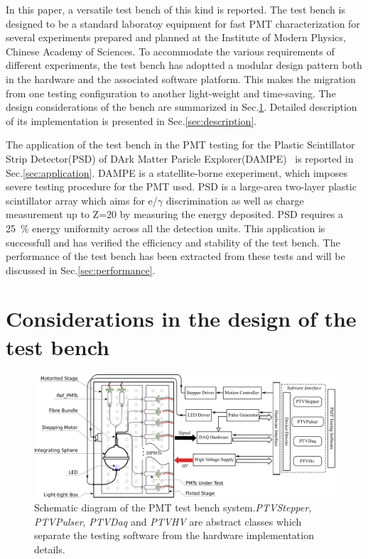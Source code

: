 \documentclass[5p, times]{elsarticle}
\begin{document}
In this paper, a versatile test bench of this kind is reported.
The test bench is designed to be a standard laboratoy equipment for fast PMT characterization for several experiments prepared and planned at the Institute of Modern Physics, Chinese Academy of Sciences.
To accommodate the various requirements of different experiments, the test bench has adoptted a modular design pattern both in the hardware and the associated software platform.
This makes the migration from one testing configuration to another light-weight and time-saving.
The design considerations of the bench are summarized in Sec.\ref{sec:design_consideration}.
Detailed description of its implementation is presented in Sec.\ref{sec:description}.

The application of the test bench in the PMT testing for the Plastic Scintillator Strip Detector(PSD) of DArk Matter Paricle Explorer(DAMPE)~\cite{Chang_Jin_dampe} is reported in Sec.\ref{sec:application}.
DAMPE is a statellite-borne  exeperiment, which imposes severe testing procedure for the PMT used.
PSD is a large-area two-layer plastic scintillator array which aims for  e/$\gamma$ discrimination as well as charge measurement up to Z=20 by measuring the energy deposited.
PSD requires a \SI{25}{\percent} energy uniformity across all the detection units.
This application is successfull and has verified the efficiency and stability of the test bench.
The performance of the test bench has been extracted from these tests and will be discussed in Sec.\ref{sec:performance}.

\section{Considerations in the design of the test bench}
\label{sec:design_consideration}

\begin{figure}
 \centering
 \includegraphics[width=160mm]{testbench_overview}
\caption{Schematic diagram of the PMT test bench system.\textit{PTVStepper}, \textit{PTVPulser}, \textit{PTVDaq} and \textit{PTVHV} are abstract classes which separate the testing software from the hardware implementation details.}
\label{fig:testbench_overveiw}
\end{figure}
\end{document}
